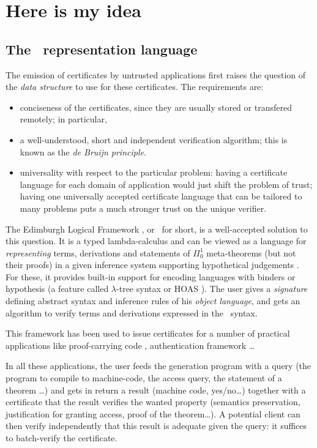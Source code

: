 \documentclass[9pt]{sigplanconf}
\begin{document}
\section{Here is my idea}

\subsection{The \LF\ representation language}

The emission of certificates by untrusted applications first raises
the question of the \emph{data structure} to use for these
certificates. The requirements are:
\begin{itemize}
\item conciseness of the certificates, since they are usually stored
  or transfered remotely; in particular,
\item a well-understood, short and independent verification algorithm;
  this is known as the \emph{de Bruijn principle}.
\item universality with respect to the particular problem: having a
  certificate language for each domain of application would just shift
  the problem of trust; having one universally accepted certificate
  language that can be tailored to many problems puts a much stronger
  trust on the unique verifier.
\end{itemize}

The Edimburgh Logical Framework \cite{harper1993framework}, or \LF\
for short, is a well-accepted solution to this question. It is a typed
lambda-calculus and can be viewed as a language for
\emph{representing} terms, derivations and statements of $\Pi_0^1$
meta-theorems (but not their proofs) in a given inference system
supporting hypothetical judgements \cite{pfenning2001logical}. For
these, it provides built-in support for encoding languages with
binders or hypothesis (a feature called $\lambda$-tree syntax or HOAS
\cite{pfenning1988higher}). The user gives a \emph{signature} defining
abstract syntax and inference rules of his \emph{object language}, and
gets an algorithm to verify terms and derivations expressed in the
\LF\ syntax.

This framework has been used to issue certificates for a number of
practical applications like proof-carrying code
\cite{necula1997proof}, authentication framework \cite{appel1999proof}
\ldots %

In all these applications, the user feeds the generation program with
a query (the program to compile to machine-code, the access query, the
statement of a theorem \ldots) and gets in return a result (machine
code, yes/no\ldots) together with a certificate that the result
verifies the wanted property (semantics preservation, justification
for granting access, proof of the theorem\ldots). A potential client
can then verify independently that this result is adequate given the
query: it suffices to batch-verify the certificate.
\end{document}
